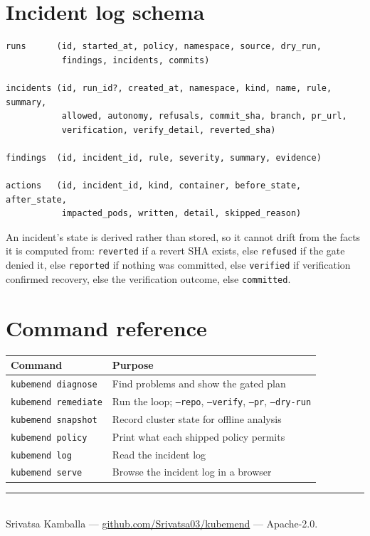 \documentclass[11pt,a4paper]{article}
\newcommand{\code}[1]{\texttt{\small #1}}
\begin{document}
\appendix
\section{Incident log schema}

\begin{lstlisting}[caption={Four tables. \code{run\_id} is nullable: an incident recorded outside a run is still worth keeping.}]
runs      (id, started_at, policy, namespace, source, dry_run,
           findings, incidents, commits)

incidents (id, run_id?, created_at, namespace, kind, name, rule, summary,
           allowed, autonomy, refusals, commit_sha, branch, pr_url,
           verification, verify_detail, reverted_sha)

findings  (id, incident_id, rule, severity, summary, evidence)

actions   (id, incident_id, kind, container, before_state, after_state,
           impacted_pods, written, detail, skipped_reason)
\end{lstlisting}

An incident's state is derived rather than stored, so it cannot drift from the
facts it is computed from: \code{reverted} if a revert SHA exists, else
\code{refused} if the gate denied it, else \code{reported} if nothing was
committed, else \code{verified} if verification confirmed recovery, else the
verification outcome, else \code{committed}.

\section{Command reference}

\begin{tabularx}{\textwidth}{@{}l X@{}}
\toprule
\textbf{Command} & \textbf{Purpose} \\
\midrule
\code{kubemend diagnose}  & Find problems and show the gated plan \\
\code{kubemend remediate} & Run the loop; \code{--repo}, \code{--verify}, \code{--pr}, \code{--dry-run} \\
\code{kubemend snapshot}  & Record cluster state for offline analysis \\
\code{kubemend policy}    & Print what each shipped policy permits \\
\code{kubemend log}       & Read the incident log \\
\code{kubemend serve}     & Browse the incident log in a browser \\
\bottomrule
\end{tabularx}

\vspace{1em}
\noindent\rule{\textwidth}{0.4pt}\\[4pt]
{\footnotesize Srivatsa Kamballa --- \href{https://github.com/Srivatsa03/kubemend}{github.com/Srivatsa03/kubemend} --- Apache-2.0.}
\end{document}
